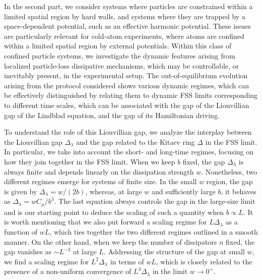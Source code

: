
In the second part, we consider
systems where particles are constrained within a limited
spatial region by hard walls, and systems where they are
trapped by a space-dependent potential, such as an 
effective harmonic potential. These issues are particularly
relevant for cold-atom experiments, where atoms are 
confined within a limited spatial region by external 
potentials. Within this class of confined particle systems,
we investigate the dynamic features arising from 
localized particle-loss dissipative mechanisms, which may be
controllable, or inevitably present, in the experimental
setup. The out-of-equilibrium evolution arising from the protocol considered
shows various dynamic regimes, which can be effectively
distinguished by relating them to dynamic FSS
limits corresponding to different time scales, which can
be associated with the gap of the Liouvillian gap of the
Lindblad equation, and the gap of its Hamiltonian driving.

To understand the role of this Liouvillian gap,
we analyze the interplay between the Liouvillian gap $\Delta_\lambda$ and the gap related to the Kitaev ring $\Delta$ in the FSS limit. In particular, we take into account the short- and long-time regimes, focusing on how they join together in the FSS limit.
When we
keep $b$ fixed, the gap $\Delta_\lambda$ is always finite and depends
linearly on the dissipation strength $w$. Nonetheless, two different regimes emerge for systems of finite size. In the small $w$ region, the gap is given by $\Delta_\lambda=w/(2b)$, whereas, at large $w$ and sufficiently large $b$, it behaves as $\Delta_\lambda=w C_\mu/b^3$. The last equation always controls the gap in the large-size limit and is our starting point to deduce the scaling of such a quantity when $b\propto L$. It is worth mentioning that we also put forward a scaling regime for $L\Delta_\lambda$ as a function of $wL$, which ties together the two different regimes outlined in a smooth manner. On the other hand, when we keep the number of dissipators $n$ fixed, the gap vanishes as $\sim L^{-3}$ at large $L$. Addressing the structure of the gap at small $w$, we find a scaling regime for $L^2\Delta_\lambda$ in terms of $wL$, which is closely related to the presence of a non-uniform convergence of $L^3\Delta_\lambda$ in the limit $w\to0^+$.

